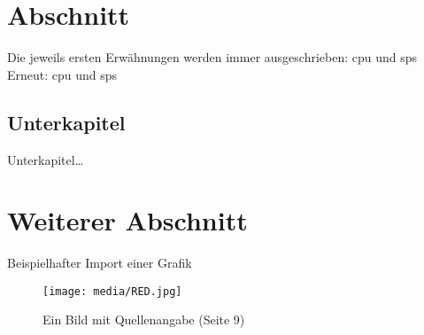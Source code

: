 \label{ch_basis}

\section{Abschnitt}

Die jeweils ersten Erwähnungen werden immer ausgeschrieben:
\newline
\ac{cpu} und \ac{sps}
\newline
Erneut:
\newline
\ac{cpu} und \ac{sps}

\subsection{Unterkapitel}

Unterkapitel\ldots

\section{Weiterer Abschnitt}

Beispielhafter Import einer Grafik 
\begin{figure}[h]
  \vspace{0.3cm}
  \begin{center}
    \texttt{[image: media/RED.jpg]}
    \captionsetup{width=0.8\textwidth}
    \caption[Kurze Bildbeschreibung]{Ein Bild mit Quellenangabe \parencite[]{Siemens} (Seite 9)}
    \label{platzhalterx}
  \end{center}
  \vspace{-0.4cm}
\end{figure}
